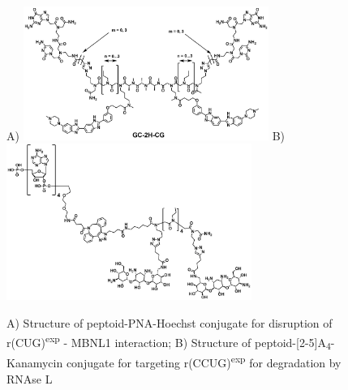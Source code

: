 \documentclass{tufte-handout}
\begin{document}
\begin{figure}
	A)
	\includegraphics[width=80mm]{GC-2H-CG.png}
	B)
	\includegraphics[width=80mm]{2Kan-p2-5A4.png}
	\caption{A) Structure of peptoid-PNA-Hoechst conjugate for disruption of r(CUG)\textsuperscript{exp} - MBNL1 interaction; B) Structure of peptoid-[2-5]A\textsubscript{4}-Kanamycin conjugate for targeting r(CCUG)\textsuperscript{exp} for degradation by RNAse L}
	\label{fig:kanamycin-dimers}
\end{figure}




\end{document}
